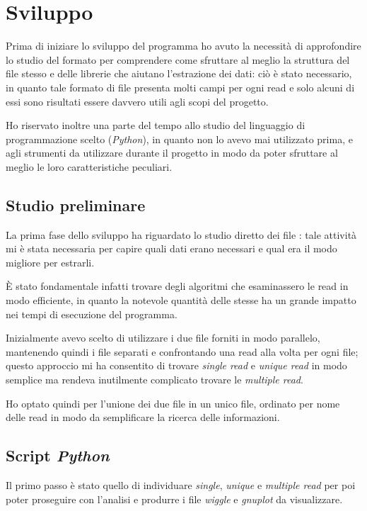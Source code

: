 \section{Sviluppo}
Prima di iniziare lo sviluppo del programma ho avuto la necessità di approfondire lo studio del formato  per comprendere come sfruttare al meglio la struttura del file stesso e delle librerie che aiutano l'estrazione dei dati: ciò è stato necessario, in quanto tale formato di file presenta molti campi per ogni read e solo alcuni di essi sono risultati essere davvero utili agli scopi del progetto.

Ho riservato inoltre una parte del tempo allo studio del linguaggio di programmazione scelto (\emph{Python}), in quanto non lo avevo mai utilizzato prima, e agli strumenti da utilizzare durante il progetto in modo da poter sfruttare al meglio le loro caratteristiche peculiari.

\subsection{Studio preliminare}
La prima fase dello sviluppo ha riguardato lo studio diretto dei file : tale attività mi è stata necessaria per capire quali dati erano necessari e qual era il modo migliore per estrarli.

È stato fondamentale infatti trovare degli algoritmi che esaminassero le read in modo efficiente, in quanto la notevole quantità delle stesse ha un grande impatto nei tempi di esecuzione del programma.

Inizialmente avevo scelto di utilizzare i due file  forniti in modo parallelo, mantenendo quindi i file separati e confrontando una read alla volta per ogni file; questo approccio mi ha consentito di trovare \emph{single read} e \emph{unique read} in modo semplice ma rendeva inutilmente complicato trovare le \emph{multiple read}.

Ho optato quindi per l'unione dei due file in un unico file, ordinato per nome delle read in modo da semplificare la ricerca delle informazioni.

\subsection{Script \emph{Python}}
Il primo passo è stato quello di individuare \emph{single}, \emph{unique} e \emph{multiple read} per poi poter proseguire con l'analisi e produrre i file \emph{wiggle} e \emph{gnuplot} da visualizzare.

